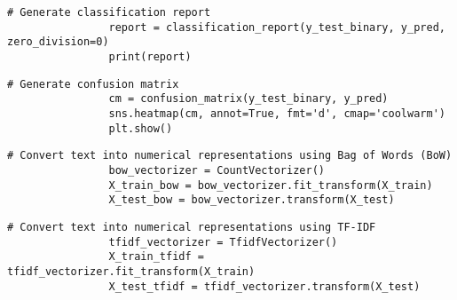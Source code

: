             \vspace{0.5em}
            
            \begin{lstlisting}[caption={Generate classification report}, label={lst:classification_report}]
                # Generate classification report
                report = classification_report(y_test_binary, y_pred, zero_division=0)
                print(report)
            \end{lstlisting}
            
            \vspace{0.5em}
            
            \begin{lstlisting}[caption={Generate confusion matrix}, label={lst:confusion_matrix}]
                # Generate confusion matrix
                cm = confusion_matrix(y_test_binary, y_pred)
                sns.heatmap(cm, annot=True, fmt='d', cmap='coolwarm')
                plt.show()
            \end{lstlisting}
            
            \vspace{0.5em}
            
            \begin{lstlisting}[caption={Convert text using Bag of Words (BoW)}, label={lst:bow_conversion}]
                # Convert text into numerical representations using Bag of Words (BoW)
                bow_vectorizer = CountVectorizer()
                X_train_bow = bow_vectorizer.fit_transform(X_train)
                X_test_bow = bow_vectorizer.transform(X_test)
            \end{lstlisting}
            
            \vspace{0.5em}
            
            \begin{lstlisting}[caption={Convert text using TF-IDF}, label={lst:tfidf_conversion}]
                # Convert text into numerical representations using TF-IDF
                tfidf_vectorizer = TfidfVectorizer()
                X_train_tfidf = tfidf_vectorizer.fit_transform(X_train)
                X_test_tfidf = tfidf_vectorizer.transform(X_test)
            \end{lstlisting}
            
